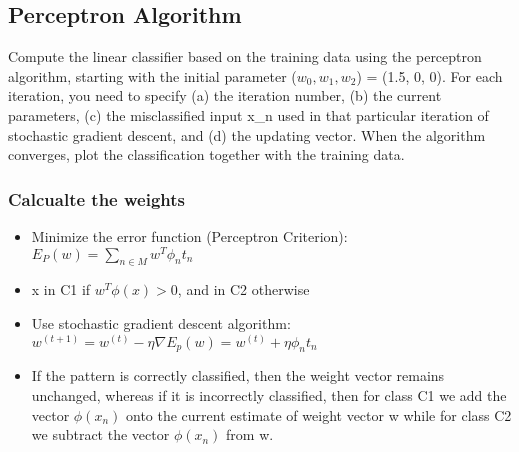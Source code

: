 \documentclass[11pt]{article}
\providecommand{\tightlist}{%
      \setlength{\itemsep}{0pt}\setlength{\parskip}{0pt}}
\begin{document}
    \subsection{Perceptron Algorithm}\label{perceptron-algorithm}

Compute the linear classifier based on the training data using the
perceptron algorithm, starting with the initial parameter
(\(w_0 , w_1 , w_2\)) = (1.5, 0, 0). For each iteration, you need to
specify (a) the iteration number, (b) the current parameters, (c) the
misclassified input x\_n used in that particular iteration of stochastic
gradient descent, and (d) the updating vector. When the algorithm
converges, plot the classification together with the training data.

    \subsubsection{Calcualte the weights}\label{calcualte-the-weights}

\begin{itemize}
\tightlist
\item
  Minimize the error function (Perceptron Criterion):
  \(E_P(w) = \sum_{n \in M}{w^T \phi_n t_n}\)
\item
  x in C1 if \(w^T\phi(x) > 0\), and in C2 otherwise
\item
  Use stochastic gradient descent algorithm:
  \(w^{(t+1)}=w^{(t)} - \eta\nabla E_p(w) = w^{(t)} + \eta \phi_n t_n\)
\item
  If the pattern is correctly classified, then the weight vector remains
  unchanged, whereas if it is incorrectly classified, then for class C1
  we add the vector \(\phi(x_n)\) onto the current estimate of weight
  vector w while for class C2 we subtract the vector \(\phi(x_n)\) from
  w.
\end{itemize}
\end{document}
